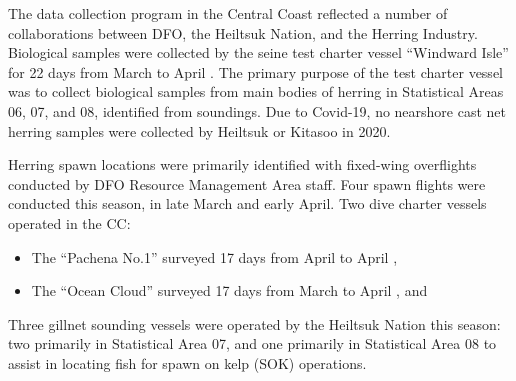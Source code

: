 The data collection program in the Central Coast reflected a number of collaborations between DFO, the Heiltsuk Nation, and the Herring Industry.
Biological samples were collected by the seine test charter vessel ``Windward Isle'' for 22 days from March  to April .
The primary purpose of the test charter vessel was to collect biological samples from main bodies of herring in Statistical Areas 06, 07, and 08, identified from soundings.
Due to Covid-19, no nearshore cast net herring samples were collected by Heiltsuk or Kitasoo in 2020.

Herring spawn locations were primarily identified with fixed-wing overflights conducted by DFO Resource Management Area staff.
Four spawn flights were conducted this season, in late March and early April.
Two dive charter vessels operated in the CC:
\begin{itemize}
\item The ``Pachena No.1'' surveyed 17 days from April  to April ,
\item The ``Ocean Cloud'' surveyed 17 days from March  to April , and
\end{itemize}
Three gillnet sounding vessels were operated by the Heiltsuk Nation this season:
two primarily in Statistical Area 07, and one primarily in Statistical Area 08 to assist in locating fish for spawn on kelp (SOK) operations.